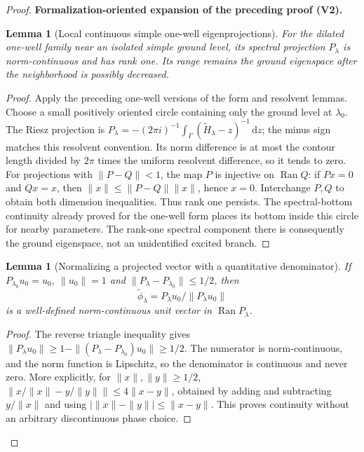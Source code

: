 \documentclass[11pt]{article}
\newtheorem{lemma}[theorem]{Lemma}
\newcommand{\formalisationparentid}{X}
\newenvironment{formalisationaddition}[1]{\par\medskip\begingroup\color{blue}\def\formalisationparentid{#1}\setcounter{formalizationsublemma}{0}\let\lemma\formalizationsublemma\let\endlemma\endformalizationsublemma
  \def\Eo{\mathcal E_h^\circ}\def\EE{\mathcal E_h}\def\phio{\phi_h^\circ}\def\phih{\phi_h}\def\Ho{H_h^{\rm atom}(v^\circ)}\def\Ha{H_h^{\rm atom}}\def\HL{H_h^{L}}\def\Dh{D_h}\def\Log{\operatorname{Log}}\def\ellh{\ell_h}\def\Gp{G_{p,h}}\def\Ast{A_{*,h}}\def\ahat{\widehat{\mathfrak a}_h}\def\ah{\mathfrak a_h}\def\rh{\widehat\rho_h}\def\deltah{\widehat\delta_h}\def\oldref##1{\textup{(##1)}}\def\interface##1{\par\noindent\textit{Analytical interface used here.} ##1\par}\def\finish{\par\noindent\textit{Conclusion of the formalization-oriented expansion.} }\par\noindent\textbf{Formalization-oriented expansion of the preceding proof (V2).}\par\smallskip
}{\par\endgroup\medskip
}
\newcommand{\Ran}{\operatorname{Ran}}
\begin{document}
\begin{proof}
\begin{formalisationaddition}{L8.6}
\begin{lemma}[Local continuous simple one-well eigenprojections]\label{sublemma:L8-6-projection}
For the dilated one-well family near an isolated simple ground level,
its spectral projection $P_\lambda$ is norm-continuous and has rank one.
Its range remains the ground eigenspace after the neighborhood is
possibly decreased.
\end{lemma}
\begin{proof}
Apply the preceding one-well versions of the form and resolvent lemmas.
Choose a small positively oriented circle containing only the ground
level at $\lambda_0$. The Riesz projection is
$P_\lambda=-(2\pi i)^{-1}\int_\Gamma
 (\widetilde H_\lambda-z)^{-1}\,\mathrm dz$;
the minus sign matches this resolvent convention.
Its norm difference is at most the contour length divided by $2\pi$
times the uniform resolvent difference, so it tends to zero.
For projections with $\|P-Q\|<1$, the map $P$ is injective on
$\Ran Q$: if $Px=0$ and $Qx=x$, then
$\|x\|\le\|P-Q\|\|x\|$, hence $x=0$.
Interchange $P,Q$ to obtain both dimension inequalities. Thus rank one
persists. The spectral-bottom continuity already proved for the
one-well form places its bottom inside this circle for nearby
parameters. The rank-one spectral component there is consequently
the ground eigenspace, not an unidentified excited branch.
\end{proof}

\begin{lemma}[Normalizing a projected vector with a quantitative denominator]\label{sublemma:L8-6-normalized-vector}
If $P_{\lambda_0}u_0=u_0$, $\|u_0\|=1$ and
$\|P_\lambda-P_{\lambda_0}\|\le1/2$, then
\[
 \widetilde\phi_\lambda=
  P_\lambda u_0/\|P_\lambda u_0\|
\]
is a well-defined norm-continuous unit vector in $\Ran P_\lambda$.
\end{lemma}
\begin{proof}
The reverse triangle inequality gives
$\|P_\lambda u_0\|\ge1-\|(P_\lambda-P_{\lambda_0})u_0\|\ge1/2$.
The numerator is norm-continuous, and the norm function is Lipschitz,
so the denominator is continuous and never zero.
More explicitly, for $\|x\|,\|y\|\ge1/2$,
$\|x/\|x\|-y/\|y\|\|\le4\|x-y\|$, obtained by adding and
subtracting $y/\|x\|$ and using
$|\|x\|-\|y\||\le\|x-y\|$.
This proves continuity without an arbitrary discontinuous phase choice.
\end{proof}


\end{formalisationaddition}
\end{proof}
\end{document}
